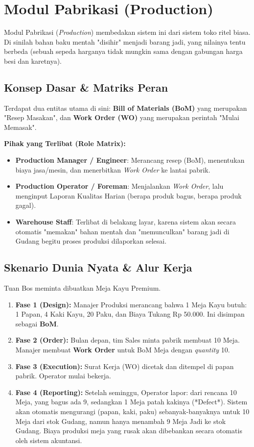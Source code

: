 \chapter{Modul Pabrikasi (Production)}

Modul Pabrikasi (\textit{Production}) membedakan sistem ini dari sistem toko ritel biasa. Di sinilah bahan baku mentah "disihir" menjadi barang jadi, yang nilainya tentu berbeda (sebuah sepeda harganya tidak mungkin sama dengan gabungan harga besi dan karetnya).

\section{Konsep Dasar \& Matriks Peran}
Terdapat dua entitas utama di sini: \textbf{Bill of Materials (BoM)} yang merupakan "Resep Masakan", dan \textbf{Work Order (WO)} yang merupakan perintah "Mulai Memasak".

\textbf{Pihak yang Terlibat (Role Matrix):}
\begin{itemize}
    \item \textbf{Production Manager / Engineer}: Merancang resep (BoM), menentukan biaya jasa/mesin, dan menerbitkan \textit{Work Order} ke lantai pabrik.
    \item \textbf{Production Operator / Foreman}: Menjalankan \textit{Work Order}, lalu menginput Laporan Kualitas Harian (berapa produk bagus, berapa produk gagal).
    \item \textbf{Warehouse Staff}: Terlibat di belakang layar, karena sistem akan secara otomatis "memakan" bahan mentah dan "memunculkan" barang jadi di Gudang begitu proses produksi dilaporkan selesai.
\end{itemize}

\section{Skenario Dunia Nyata \& Alur Kerja}
Tuan Bos meminta dibuatkan Meja Kayu Premium.
\begin{enumerate}
    \item \textbf{Fase 1 (Design):} Manajer Produksi merancang bahwa 1 Meja Kayu butuh: 1 Papan, 4 Kaki Kayu, 20 Paku, dan Biaya Tukang Rp 50.000. Ini disimpan sebagai \textbf{BoM}.
    \item \textbf{Fase 2 (Order):} Bulan depan, tim Sales minta pabrik membuat 10 Meja. Manajer membuat \textbf{Work Order} untuk BoM Meja dengan \textit{quantity} 10.
    \item \textbf{Fase 3 (Execution):} Surat Kerja (WO) dicetak dan ditempel di papan pabrik. Operator mulai bekerja.
    \item \textbf{Fase 4 (Reporting):} Setelah seminggu, Operator lapor: dari rencana 10 Meja, yang bagus ada 9, sedangkan 1 Meja patah kakinya (*Defect*). Sistem akan otomatis mengurangi (papan, kaki, paku) sebanyak-banyaknya untuk 10 Meja dari stok Gudang, namun hanya menambah 9 Meja Jadi ke stok Gudang. Biaya produksi meja yang rusak akan dibebankan secara otomatis oleh sistem akuntansi.
\end{enumerate}

